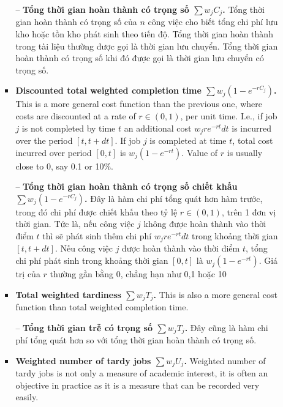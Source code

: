 \documentclass{article}
\begin{document}
\begin{itemize}
\begin{itemize}
\begin{itemize}
            -- {\bf Tổng thời gian hoàn thành có trọng số $\sum w_jC_j$.} Tổng thời gian hoàn thành có trọng số của $n$ công việc cho biết tổng chi phí lưu kho hoặc tồn kho phát sinh theo tiến độ. Tổng thời gian hoàn thành trong tài liệu thường được gọi là thời gian lưu chuyển. Tổng thời gian hoàn thành có trọng số khi đó được gọi là thời gian lưu chuyển có trọng số.
            \item {\bf Discounted total weighted completion time $\sum w_j(1 - e^{-rC_j})$.} This is a more general cost function than the previous one, where costs are discounted at a rate of $r\in(0,1)$, per unit time. I.e., if job $j$ is not completed by time $t$ an additional cost $w_jre^{-rt}dt$ is incurred over the period $[t,t + dt]$. If job $j$ is completed at time $t$, total cost incurred over period $[0,t]$ is $w_j(1 - e^{-rt})$. Value of $r$ is usually close to 0, say 0.1 or 10\%.

            -- {\bf Tổng thời gian hoàn thành có trọng số chiết khấu $\sum w_j(1 - e^{-rC_j})$.} Đây là hàm chi phí tổng quát hơn hàm trước, trong đó chi phí được chiết khấu theo tỷ lệ $r\in(0,1)$, trên 1 đơn vị thời gian. Tức là, nếu công việc $j$ không được hoàn thành vào thời điểm $t$ thì sẽ phát sinh thêm chi phí $w_jre^{-rt}dt$ trong khoảng thời gian $[t,t + dt]$. Nếu công việc $j$ được hoàn thành vào thời điểm $t$, tổng chi phí phát sinh trong khoảng thời gian $[0,t]$ là $w_j(1 - e^{-rt})$. Giá trị của $r$ thường gần bằng 0, chẳng hạn như 0,1 hoặc 10%
            \item {\bf Total weighted tardiness $\sum w_jT_j$.} This is also a more general cost function than total weighted completion time.

            -- {\bf Tổng thời gian trễ có trọng số $\sum w_jT_j$.} Đây cũng là hàm chi phí tổng quát hơn so với tổng thời gian hoàn thành có trọng số.
            \item {\bf Weighted number of tardy jobs $\sum w_jU_j$.} Weighted number of tardy jobs is not only a measure of academic interest, it is often an objective in practice as it is a measure that can be recorded very easily.


\end{itemize}
\end{itemize}
\end{itemize}
\end{document}
